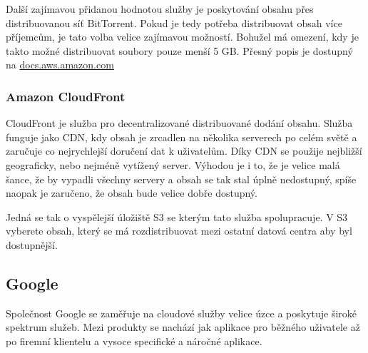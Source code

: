 Další zajímavou přidanou hodnotou služby je poskytování obsahu přes distribuovanou síť BitTorrent. Pokud je tedy potřeba distribuovat obsah více příjemcům, je tato volba velice zajímavou možností. Bohužel má omezení, kdy je takto možné distribuovat soubory pouze menší 5 GB. Přesný popis je dostupný na \href{http://docs.aws.amazon.com/AmazonS3/latest/dev/S3Torrent.html}{docs.aws.amazon.com}

\subsubsection{Amazon CloudFront}
CloudFront je služba pro decentralizované distribuované dodání obsahu. Služba funguje jako CDN, kdy obsah je zrcadlen na několika serverech po celém světě a zaručuje co nejrychlejší doručení dat k uživatelům. Díky CDN se použije nejbližší geograficky, nebo nejméně vytížený server. Výhodou je i to, že je velice malá šance, že by vypadli všechny servery a obsah se tak stal úplně nedostupný, spíše naopak je zaručeno, že obsah bude velice dobře dostupný.

Jedná se tak o vyspělejší úložiště S3 se kterým tato služba spolupracuje. V S3 vyberete obsah, který se má rozdistribuovat mezi ostatní datová centra aby byl dostupnější.

\subsection{Google}
Společnost Google se zaměřuje na cloudové služby velice úzce a poskytuje široké spektrum služeb. Mezi produkty se nachází jak aplikace pro běžného uživatele až po firemní klientelu a vysoce specifické a náročné aplikace.

